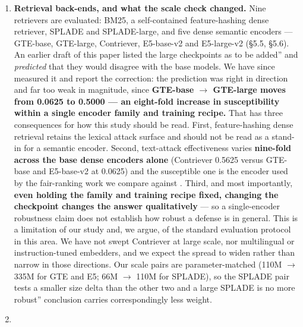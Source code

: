 \documentclass[authoryear,review,3p,times]{elsarticle}
\begin{document}
\begin{enumerate}
\item
  \textbf{Retrieval back-ends, and what the scale check changed.} Nine retrievers are evaluated: BM25, a self-contained feature-hashing dense retriever, SPLADE and SPLADE-large, and five dense semantic encoders --- GTE-base, GTE-large, Contriever, E5-base-v2 and E5-large-v2 (§5.5, §5.6). An earlier draft of this paper listed the large checkpoints as \texttt{}to be added'' and \emph{predicted} that they would disagree with the base models. We have since measured it and report the correction: the prediction was right in direction and far too weak in magnitude, since \textbf{GTE-base \(\rightarrow\) GTE-large moves from 0.0625 to 0.5000 --- an eight-fold increase in susceptibility within a single encoder family and training recipe.} That has three consequences for how this study should be read. First, feature-hashing dense retrieval retains the lexical attack surface and should not be read as a stand-in for a semantic encoder. Second, text-attack effectiveness varies \textbf{nine-fold across the base dense encoders alone} (Contriever 0.5625 versus GTE-base and E5-base-v2 at 0.0625) and the susceptible one is the encoder used by the fair-ranking work we compare against \citeauthor{kim2025b}. Third, and most importantly, \textbf{even holding the family and training recipe fixed, changing the checkpoint changes the answer qualitatively} --- so a single-encoder robustness claim does not establish how robust a defense is in general. This is a limitation of our study and, we argue, of the standard evaluation protocol in this area. We have not swept Contriever at large scale, nor multilingual or instruction-tuned embedders, and we expect the spread to widen rather than narrow in those directions. Our scale pairs are parameter-matched (110M \(\rightarrow\) 335M for GTE and E5; 66M \(\rightarrow\) 110M for SPLADE), so the SPLADE pair tests a smaller size delta than the other two and a \texttt{}large SPLADE is no more robust'' conclusion carries correspondingly less weight.
\item

\end{enumerate}
\end{document}
